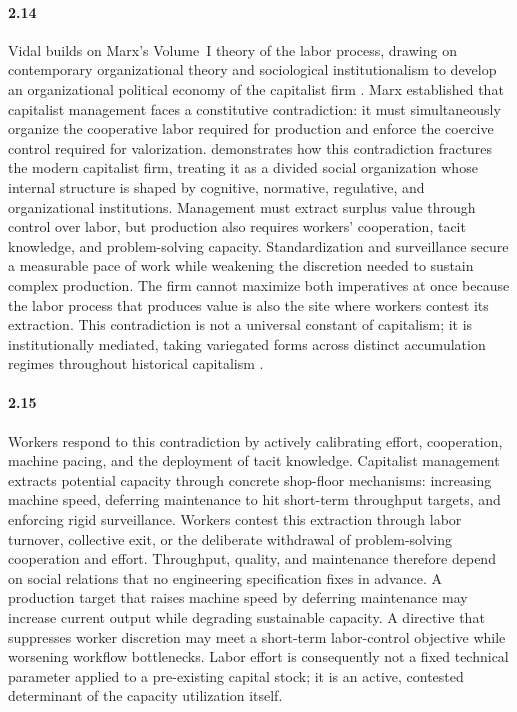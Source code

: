 \paragraph{2.14}

Vidal builds on Marx's Volume~I theory of the labor process, drawing on contemporary organizational theory and sociological institutionalism to develop an organizational political economy of the capitalist firm \citep{VidalPeck2012, Vidal2022}. Marx established that
capitalist management faces a constitutive contradiction: it
must simultaneously organize the cooperative labor required for
production and enforce the coercive control required for
valorization. \citet{Vidal2022} demonstrates how this contradiction fractures
the modern capitalist firm, treating it as a divided social
organization whose internal structure is shaped by cognitive,
normative, regulative, and organizational institutions. Management must extract surplus value through
control over labor, but production also requires workers'
cooperation, tacit knowledge, and problem-solving capacity.
Standardization and surveillance secure a measurable pace of
work while weakening the discretion needed to sustain complex
production. The firm cannot maximize both imperatives at once
because the labor process that produces value is also the site
where workers contest its extraction. This contradiction is not
a universal constant of capitalism; it is institutionally
mediated, taking variegated forms across distinct accumulation regimes throughout historical capitalism
\citep{Vidal2019}.

\paragraph{2.15}
Workers respond to this contradiction by actively calibrating
effort, cooperation, machine pacing, and the deployment of tacit
knowledge. Capitalist management extracts potential capacity
through concrete shop-floor mechanisms: increasing machine speed,
deferring maintenance to hit short-term throughput targets, and
enforcing rigid surveillance. Workers contest this extraction
through labor turnover, collective exit, or the deliberate
withdrawal of problem-solving cooperation and effort. Throughput,
quality, and maintenance therefore depend on social relations
that no engineering specification fixes in advance. A production
target that raises machine speed by deferring maintenance may
increase current output while degrading sustainable capacity. A
directive that suppresses worker discretion may meet a
short-term labor-control objective while worsening workflow
bottlenecks. Labor effort is consequently not a fixed technical
parameter applied to a pre-existing capital stock; it is an
active, contested determinant of the capacity utilization itself.


